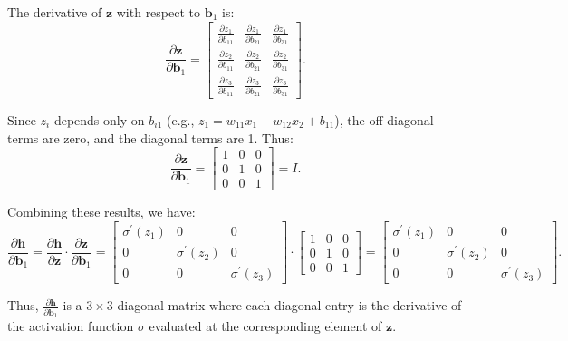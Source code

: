 \begin{notechapter}
\begin{itemize}
    The derivative of \( \mathbf{z} \) with respect to \( \mathbf{b}_1 \) is:
    \[
    \frac{\partial \mathbf{z}}{\partial \mathbf{b}_1} = \begin{bmatrix}
    \frac{\partial z_1}{\partial b_{11}} & \frac{\partial z_1}{\partial b_{21}} & \frac{\partial z_1}{\partial b_{31}} \\
    \frac{\partial z_2}{\partial b_{11}} & \frac{\partial z_2}{\partial b_{21}} & \frac{\partial z_2}{\partial b_{31}} \\
    \frac{\partial z_3}{\partial b_{11}} & \frac{\partial z_3}{\partial b_{21}} & \frac{\partial z_3}{\partial b_{31}}
    \end{bmatrix}.
    \]

    Since \( z_i \) depends only on \( b_{i1} \) (e.g., \( z_1 = w_{11}x_1 + w_{12}x_2 + b_{11} \)), the off-diagonal terms are zero, and the diagonal terms are 1. Thus:
    \[
    \frac{\partial \mathbf{z}}{\partial \mathbf{b}_1} = \begin{bmatrix}
    1 & 0 & 0 \\
    0 & 1 & 0 \\
    0 & 0 & 1
    \end{bmatrix} = I.
    \]
\end{itemize}

Combining these results, we have:
\[
\frac{\partial \mathbf{h}}{\partial \mathbf{b}_1} = \frac{\partial \mathbf{h}}{\partial \mathbf{z}} \cdot \frac{\partial \mathbf{z}}{\partial \mathbf{b}_1} = \begin{bmatrix}
\sigma^{\prime}(z_1) & 0 & 0 \\
0 & \sigma^{\prime}(z_2) & 0 \\
0 & 0 & \sigma^{\prime}(z_3)
\end{bmatrix} \cdot \begin{bmatrix}
1 & 0 & 0 \\
0 & 1 & 0 \\
0 & 0 & 1
\end{bmatrix} = 
\begin{bmatrix}
\sigma^{\prime}(z_1) & 0 & 0 \\
0 & \sigma^{\prime}(z_2) & 0 \\
0 & 0 & \sigma^{\prime}(z_3)
\end{bmatrix}.
\]

Thus, \( \frac{\partial \mathbf{h}}{\partial \mathbf{b}_1} \) is a \( 3 \times 3 \) diagonal matrix where each diagonal entry is the derivative of the activation function \( \sigma \) evaluated at the corresponding element of \( \mathbf{z} \).


\end{notechapter}
